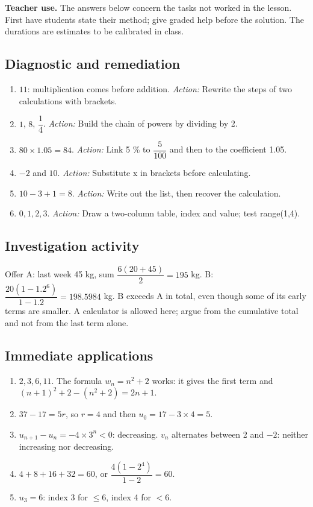\label{C01-CORR}
\textbf{Teacher use.} The answers below concern the tasks not worked in the lesson. First have students state their method; give graded help before the solution. The durations are estimates to be calibrated in class.
\subsection*{Diagnostic and remediation}
\begin{enumerate}
\item $11$: multiplication comes before addition. \textit{Action:} Rewrite the steps of two calculations with brackets.
\item $1$, $8$, $\dfrac{1}{4}$. \textit{Action:} Build the chain of powers by dividing by 2.
\item $80\times1.05=84$. \textit{Action:} Link 5 \% to $\dfrac{5}{100}$ and then to the coefficient 1.05.
\item $-2$ and $10$. \textit{Action:} Substitute x in brackets before calculating.
\item $10-3+1=8$. \textit{Action:} Write out the list, then recover the calculation.
\item $0,1,2,3$. \textit{Action:} Draw a two-column table, index and value; test range(1,4).
\end{enumerate}
\subsection*{Investigation activity}
Offer A: last week 45 kg, sum $\dfrac{6(20+45)}{2}=195$ kg. B: $\dfrac{20(1-1.2^6)}{1-1.2}=198.5984$ kg. B exceeds A in total, even though some of its early terms are smaller. A calculator is allowed here; argue from the cumulative total and not from the last term alone.
\subsection*{Immediate applications}
\begin{enumerate}
\item $2,3,6,11$. The formula $w_n=n^2+2$ works: it gives the first term and $(n+1)^2+2-(n^2+2)=2n+1$.
\item $37-17=5r$, so $r=4$ and then $u_0=17-3\times4=5$.
\item $u_{n+1}-u_n=-4\times3^n<0$: decreasing. $v_n$ alternates between 2 and $-2$: neither increasing nor decreasing.
\item $4+8+16+32=60$, or $\dfrac{4(1-2^4)}{1-2}=60$.
\item $u_3=6$: index 3 for $\leq6$, index 4 for $<6$.
\end{enumerate}
